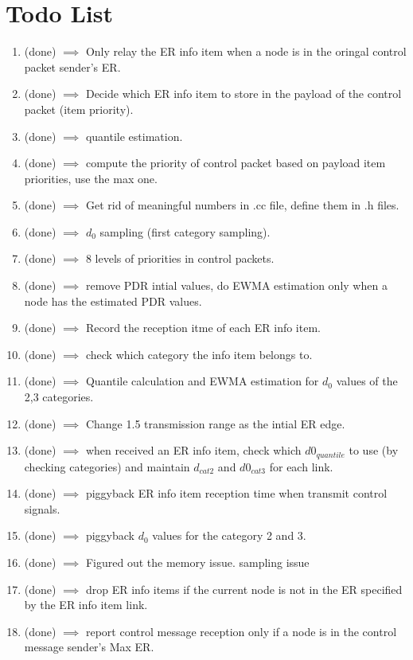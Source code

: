 \section{Todo List}
\begin{enumerate}
\item (done) $\implies$ Only relay the ER info item when a node is in the oringal control packet sender's ER.
\item (done) $\implies$ Decide which ER info item to store in the payload of the control packet (item priority).
\item (done) $\implies$ quantile estimation.
\item (done) $\implies$ compute the priority of control packet based on payload item priorities, use the max one.
\item (done) $\implies$ Get rid of meaningful numbers in .cc file, define them in .h files.
\item (done) $\implies$ $d_0$ sampling (first category sampling).
\item (done) $\implies$ 8 levels of priorities in control packets.
\item (done) $\implies$ remove PDR intial values, do EWMA estimation only when a node has the estimated PDR values.
\item (done) $\implies$ Record the reception itme of each ER info item.
\item (done) $\implies$ check which category the info item belongs to.
\item (done) $\implies$ Quantile calculation and EWMA estimation for $d_0$ values of the 2,3 categories.
\item (done) $\implies$ Change 1.5 transmission range as the intial ER edge.
\item (done) $\implies$ when received an ER info item, check which $d0_{quantile}$ to use (by checking categories) and maintain $d_{cat2}$ and $d0_{cat3}$ for each link.
\item (done) $\implies$ piggyback ER info item reception time when transmit control signals.
\item (done) $\implies$ piggyback $d_0$ values for the category 2 and 3.
\item (done) $\implies$ Figured out the memory issue. sampling issue
\item (done) $\implies$ drop ER info items if the current node is not in the ER specified by the ER info item link.
\item (done) $\implies$ report control message reception only if a node is in the control message sender's Max ER.

\end{enumerate}
